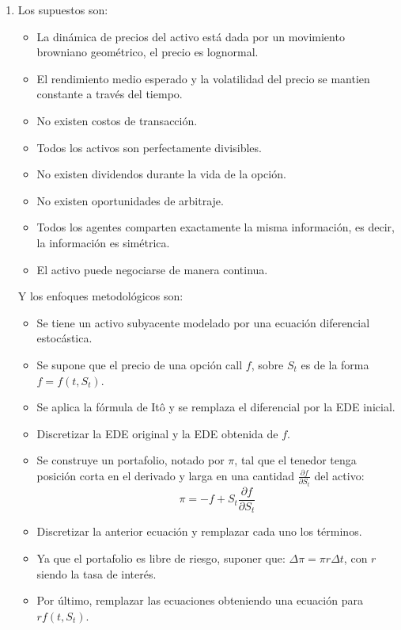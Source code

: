 \documentclass[fleqn]{article}
\begin{document}
\begin{enumerate}
\item Los supuestos son:
  \begin{itemize}
  \item La dinámica de precios del activo está dada por un movimiento
    browniano geométrico, el precio es lognormal.
  \item El rendimiento medio esperado y la volatilidad del precio se
    mantien constante a través del tiempo.
  \item No existen costos de transacción.
  \item Todos los activos son perfectamente divisibles.
  \item No existen dividendos durante la vida de la opción.
  \item No existen oportunidades de arbitraje.
  \item Todos los agentes comparten exactamente la misma información,
    es decir, la información es simétrica.
  \item El activo puede negociarse de manera continua.
  \end{itemize}

  Y los enfoques metodológicos son:
  \begin{itemize}
  \item Se tiene un activo subyacente modelado por una ecuación
    diferencial estocástica.
  \item Se supone que el precio de una opción call $f$, sobre $S_t$ es
    de la forma $f = f(t, S_t)$.
  \item Se aplica la fórmula de Itô y se remplaza el diferencial por
    la EDE inicial.
  \item Discretizar la EDE original y la EDE obtenida de $f$.
  \item Se construye un portafolio, notado por $\pi$, tal que el
    tenedor tenga posición corta en el derivado y larga en una
    cantidad $\frac{\partial f}{\partial S_t}$ del activo:
    \begin{equation*}
      \pi = - f + S_t\frac{\partial f}{\partial S_t}
    \end{equation*}
  \item Discretizar la anterior ecuación y remplazar cada uno los
    términos.
  \item Ya que el portafolio es libre de riesgo, suponer que:
    $\Delta\pi =\pi r \Delta t$, con $r$ siendo la tasa de interés.
  \item Por último, remplazar las ecuaciones obteniendo una ecuación
    para $rf(t, S_t)$.
  \end{itemize}
\end{enumerate}
\end{document}
